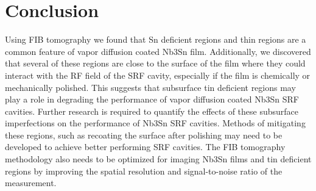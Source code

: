 \section{Conclusion}

Using FIB tomography we found that Sn deficient regions and thin regions are a common feature of vapor diffusion coated Nb3Sn film. Additionally, we discovered that several of these regions are close to the surface of the film where they could interact with the RF field of the SRF cavity, especially if the film is chemically or mechanically polished. This suggests that subsurface tin deficient regions may play a role in degrading the performance of vapor diffusion coated Nb3Sn SRF cavities. Further research is required to quantify the effects of these subsurface imperfections on the performance of Nb3Sn SRF cavities. Methods of mitigating these regions, such as recoating the surface after polishing may need to be developed to achieve better performing SRF cavities. The FIB tomography methodology also needs to be optimized for imaging Nb3Sn films and tin deficient regions by improving the spatial resolution and signal-to-noise ratio of the measurement.

